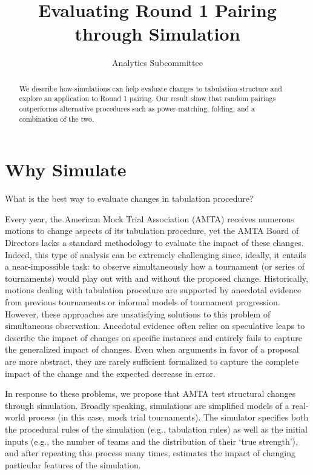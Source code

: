 \documentclass{tufte-handout}
\title{Evaluating Round 1 Pairing through Simulation%
}
\author{Analytics Subcommittee}
\begin{document}
\maketitle%

\begin{abstract}
\noindent We describe how simulations can help evaluate 
changes to tabulation structure and explore an application to Round 1 pairing. Our result show that random pairings outperforms alternative procedures such as power-matching, folding, and a combination of the two.
\end{abstract}


\section{Why Simulate}
What is the best way to evaluate changes in tabulation procedure?

Every year, the American Mock Trial Association (AMTA) receives numerous motions to change aspects of its tabulation procedure, yet the AMTA Board of Directors lacks a standard methodology to evaluate the impact of these changes. Indeed, this type of analysis can be extremely challenging since, ideally, it entails a near-impossible task: to observe simultaneously how a tournament (or series of tournaments) would play out with and without the proposed change. %
Historically, motions dealing with tabulation procedure are supported by anecdotal evidence from previous tournaments or informal models of tournament progression. However, these approaches are unsatisfying solutions to this problem of simultaneous observation. Anecdotal evidence often relies on speculative leaps to describe the impact of changes on specific instances and entirely fails to capture the generalized impact of changes. Even when arguments in favor of a proposal are more abstract, they are rarely sufficient formalized to capture the complete impact of the change and the expected decrease in error.

In response to these problems, we propose that AMTA test structural changes through simulation. Broadly speaking, simulations are simplified models of a real-world process (in this case, mock trial tournaments). The simulator specifies both the procedural rules of the simulation (e.g., tabulation rules) as well as the initial inputs (e.g., the number of teams and the distribution of their `true strength'), and after repeating this process many times, estimates the impact of changing particular features of the simulation.
\end{document}
